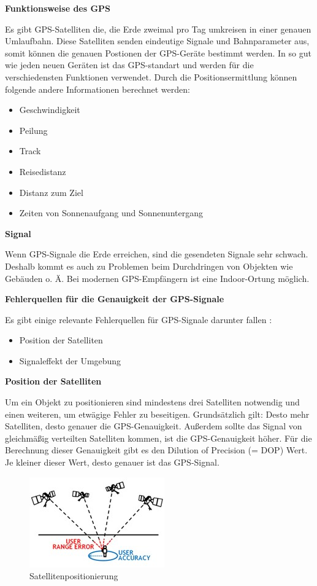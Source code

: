 \textbf{Funktionsweise des GPS}

Es gibt GPS-Satelliten die, die Erde zweimal pro Tag umkreisen in einer genauen Umlaufbahn. Diese Satelliten senden eindeutige Signale und Bahnparameter aus, somit können die genauen Postionen der GPS-Geräte bestimmt werden. 
In so gut wie jeden neuen Geräten ist das GPS-standart und werden für die verschiedensten Funktionen verwendet. Durch die Positionsermittlung können folgende andere Informationen berechnet werden:

\begin{itemize}
	\item Geschwindigkeit
	\item Peilung
	\item Track
	\item Reisedistanz
	\item Distanz zum Ziel
	\item Zeiten von Sonnenaufgang und Sonnenuntergang
\end{itemize}

\textbf{Signal}

Wenn GPS-Signale die Erde erreichen, sind die gesendeten Signale sehr schwach. Deshalb kommt es auch zu Problemen beim Durchdringen von Objekten wie Gebäuden o. Ä. Bei modernen GPS-Empfängern ist eine Indoor-Ortung möglich.

\textbf{Fehlerquellen für die Genauigkeit der GPS-Signale}

Es gibt einige relevante Fehlerquellen für GPS-Signale darunter fallen \textcite{GPSFehlerquellen}:
\begin{itemize}
	\item Position der Satelliten
	\item Signaleffekt der Umgebung
\end{itemize}


\textbf{Position der Satelliten}

Um ein Objekt zu positionieren sind mindestens drei Satelliten notwendig und einen weiteren, um etwägige Fehler zu beseitigen. Grundsätzlich gilt: Desto mehr Satelliten, desto genauer die GPS-Genauigkeit. Außerdem sollte das Signal von gleichmäßig verteilten Satelliten kommen, ist die GPS-Genauigkeit höher. Für die Berechnung dieser Genauigkeit gibt es den Dilution of Precision (= DOP) Wert.  Je kleiner dieser Wert, desto genauer ist das GPS-Signal.
\begin{figure}[H]
	\centering
	\includegraphics[width=0.7\linewidth]{images/Satellitenposition.jpg}
	\caption[Satellitenpositionierung]{Satellitenpositionierung}
	\label{fig:Satellitenposition}
\end{figure}

